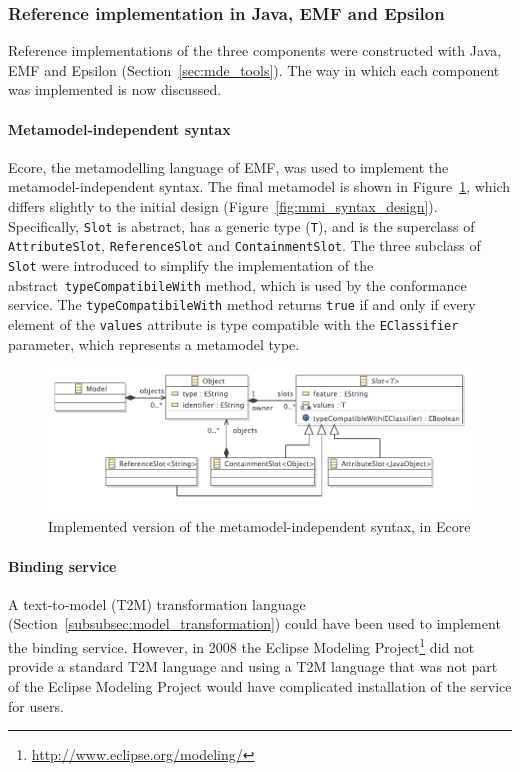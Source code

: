 \subsubsection{Reference implementation in Java, EMF and Epsilon}
\label{subsubsec:mmi_impl}
Reference implementations of the three components were constructed with Java, EMF and Epsilon (Section~\ref{sec:mde_tools}). The way in which each component was implemented is now discussed.

\paragraph{Metamodel-independent syntax} Ecore, the metamodelling language of EMF, was used to implement the metamodel-independent syntax. The final metamodel is shown in Figure~\ref{fig:mmi_syntax_impl}, which differs slightly to the initial design (Figure~\ref{fig:mmi_syntax_design}). Specifically, \texttt{Sl\-ot} is abstract, has a generic type (\texttt{T}), and is the superclass of \texttt{Att\-ri\-bu\-teSl\-ot}, \texttt{Re\-fe\-re\-n\-ceSl\-ot} and \texttt{Co\-nt\-ai\-nm\-entSl\-ot}. The three subclass of \texttt{Sl\-ot} were introduced to simplify the implementation of the abstract \texttt{ty\-peCo\-mp\-at\-ib\-i\-leWi\-th} method, which is used by the conformance service. The \texttt{ty\-peCo\-mp\-at\-ib\-i\-leWi\-th} method returns \texttt{true} if and only if every element of the \texttt{va\-lu\-es} attribute is type compatible with the \texttt{EC\-la\-ss\-if\-ier} parameter, which represents a metamodel type.  

\begin{figure}[htbp]
  \centering
  \includegraphics[width=12cm]{5.Implementation/images/slot_model_complete.pdf}
  \caption{Implemented version of the metamodel-independent syntax, in Ecore}
  \label{fig:mmi_syntax_impl}
\end{figure}

\paragraph{Binding service} A text-to-model (T2M) transformation language (Section~\ref{subsubsec:model_transformation}) could have been used to implement the binding service. However, in 2008 the Eclipse Modeling Project\footnote{\url{http://www.eclipse.org/modeling/}} did not provide a standard T2M language and using a T2M language that was not part of the Eclipse Modeling Project would have complicated installation of the service for users.

